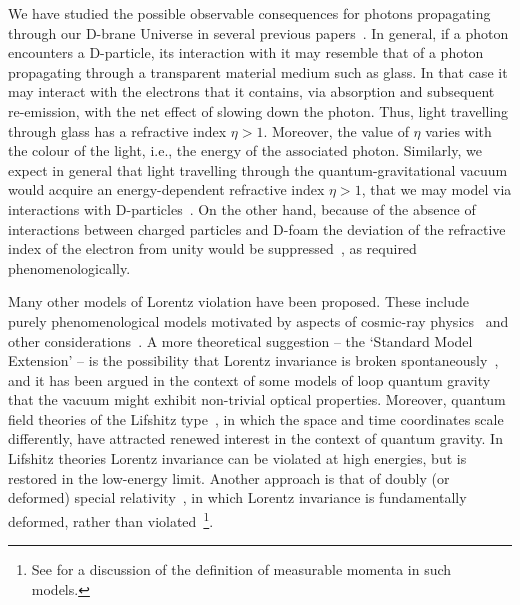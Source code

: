 \documentclass[12pt]{article}
\begin{document}
We have studied the possible observable consequences for photons propagating through our D-brane Universe
in several previous papers~\cite{AEMNS,dfoam,mitsou,emnewuncert,EMNS,EMNSS}.
In general, if a photon encounters a D-particle, its interaction with it may resemble that of a photon
propagating through a transparent material medium such as glass. In that case it may interact with the
electrons that it contains, via absorption and subsequent re-emission, with the net
effect of slowing down the photon. Thus, light travelling through glass has a
refractive index $\eta > 1$. Moreover, the value of $\eta$ varies with the colour of the light, i.e., the energy of the
associated photon. Similarly, we expect in general that light travelling through the
quantum-gravitational vacuum would acquire an energy-dependent
refractive index $\eta > 1$, that we may model via interactions with D-particles~\cite{emnewuncert}.
On the other hand, because of the absence of interactions between charged particles and D-foam
the deviation of the refractive index of the electron from unity would be suppressed~\cite{synchr,emnewuncert},
as required phenomenologically.

Many other models of Lorentz violation have been proposed.
These include purely phenomenological models motivated by
aspects of cosmic-ray physics~\cite{mestres} and other considerations~\cite{pheno}.
A more theoretical suggestion -- the `Standard Model Extension' -- is the possibility that Lorentz invariance is broken
spontaneously~\cite{sme,pospelov,Kost_LV_operators}, and it has been
argued in the context of some models of loop quantum gravity~\cite{loop}
that the vacuum might exhibit non-trivial optical properties. Moreover,
quantum field theories of the Lifshitz type~\cite{lifsh}, in which the space
and time coordinates scale differently, have attracted renewed interest
in the context of quantum gravity. In Lifshitz theories
Lorentz invariance can be violated at high energies, but is
restored in the low-energy limit. Another approach is that of doubly
(or deformed) special relativity~\cite{dsr}, in which Lorentz invariance
is fundamentally deformed, rather than violated~\footnote{See \cite{dsrdoubts} for a discussion of the definition of
measurable momenta in such models.}.
\end{document}
